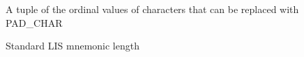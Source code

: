 \documentclass[letterpaper,10pt,english]{sphinxmanual}
\begin{document}
\begin{fulllineitems}
\label{\detokenize{ref/LIS/core/Mnem:TotalDepth.LIS.core.Mnem.ORDS_REPLACE}}
A tuple of the ordinal values of characters that can be replaced with PAD\_CHAR

\end{fulllineitems}


\begin{fulllineitems}
\label{\detokenize{ref/LIS/core/Mnem:TotalDepth.LIS.core.Mnem.LEN_MNEM}}
Standard LIS mnemonic length

\end{fulllineitems}

\end{document}
